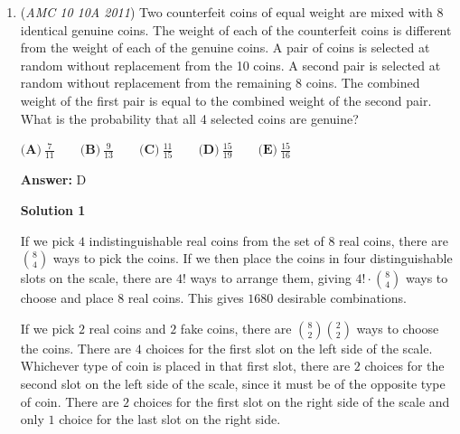 \begin{enumerate}
\textbf{Solution 2}

Ideally, if $A$ and $B$ had chords $c_1, c_2$, the only way $c_1 \cap c_2 \neq \emptyset$ is if $AB \leq r$. Thus, the maximum possible intersections occur when the ends of the chords $C$ and $D$ degenerate, forming equilateral triangle $ABC$ with radius $r$.

 Thus, if $O$ is the center of this circle, then $B$ must lie on the $\frac{2}{3}$ arc of the circumference such that $AB \leq r$. If it were to lie on the other $\frac{1}{3}$, then $AB > r$ which is not allowed.

 However, we limit $B$ to be counterclockwise to that of $A$, so half of the viable $\frac{2}{3}$ arc region is invalid (as that implies $B$ must be on a chord that is formed by moving counterclockwise). Thus, the probability is $\boxed{\frac{1}{3}}$.

 


	\item (\textit{AMC 10 10A 2011}) Two counterfeit coins of equal weight are mixed with 8 identical genuine coins. The weight of each of the counterfeit coins is different from the weight of each of the genuine coins. A pair of coins is selected at random without replacement from the 10 coins. A second pair is selected at random without replacement from the remaining 8 coins. The combined weight of the first pair is equal to the combined weight of the second pair. What is the probability that all 4 selected coins are genuine?


 $\textbf{(A)}\ \frac{7}{11}\qquad\textbf{(B)}\ \frac{9}{13}\qquad\textbf{(C)}\ \frac{11}{15}\qquad\textbf{(D)}\ \frac{15}{19}\qquad\textbf{(E)}\ \frac{15}{16}$

 \textbf{Answer: }D



\textbf{Solution 1}

If we pick $4$ indistinguishable real coins from the set of $8$ real coins, there are $\binom{8}{4}$ ways to pick the coins.  If we then place the coins in four distinguishable slots on the scale, there are $4!$ ways to arrange them, giving $4!\cdot \binom{8}{4}$ ways to choose and place $8$ real coins.  This gives $1680$ desirable combinations.

 If we pick $2$ real coins and $2$ fake coins, there are $\binom{8}{2}\binom{2}{2}$ ways to choose the coins.  There are $4$ choices for the first slot on the left side of the scale.  Whichever type of coin is placed in that first slot, there are $2$ choices for the second slot on the left side of the scale, since it must be of the opposite type of coin.  There are $2$ choices for the first slot on the right side of the scale and only $1$ choice for the last slot on the right side.


\end{enumerate}
